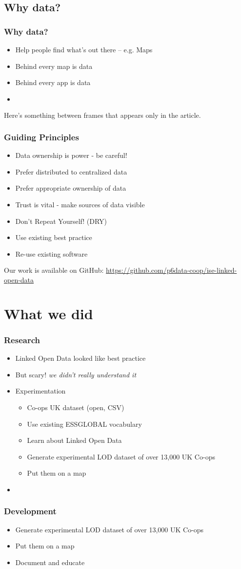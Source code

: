 \subsection{Why data?}
\frame
{
  \frametitle{Why data?}
  \begin{itemize}
    \item Help people find what's out there -- e.g. Maps
    \item Behind every map is data
    \item Behind every app is data
    \item 
  \end{itemize}
}
Here's something between frames that appears only in the article.
\frame
{
  \frametitle{Guiding Principles}
  \begin{itemize}
    \item Data ownership is power - be careful!
    \item Prefer distributed to centralized data
    \item Prefer appropriate ownership of data
    \item Trust is vital - make sources of data visible
    \item Don't Repeat Yourself! (DRY)
    \item Use existing best practice
    \item Re-use existing software
  \end{itemize}
}
Our work is available on GitHub: \url{https://github.com/p6data-coop/ise-linked-open-data}
\section{What we did}
\frame
{
  \frametitle{Research}
  \begin{itemize}
    \item Linked Open Data looked like best practice
    \item But scary! {\em we didn't really understand it}
    \item Experimentation
      \begin{itemize}
	\item Co-ops UK dataset (open, CSV)
	\item Use existing ESSGLOBAL vocabulary
	\item Learn about Linked Open Data
	\item Generate experimental LOD dataset of over 13,000 UK Co-ops
	\item Put them on a map
      \end{itemize}
    \item 
  \end{itemize}
}
\frame
{
  \frametitle{Development}
  \begin{itemize}
    \item Generate experimental LOD dataset of over 13,000 UK Co-ops
    \item Put them on a map
    \item Document and educate
  \end{itemize}
}
